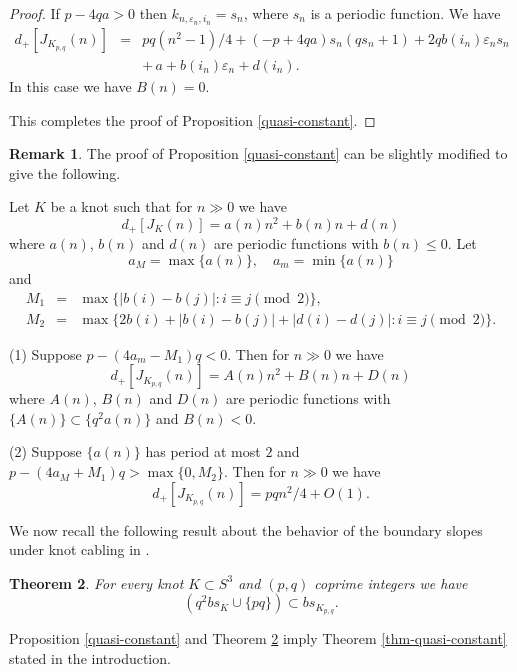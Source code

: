 \documentclass[11pt]{amsart}
\numberwithin{equation}{section}
\theoremstyle{plain}
\newtheorem{theorem}{Theorem}[section]
\theoremstyle{definition}
\newtheorem{remark}[theorem]{Remark}
\newcommand{\QQ}{{\mathbb{Q}}}
\newcommand{\K}{{K_{p, q}}}
\newcommand\no[1]{}
\def\ve{\varepsilon}
\begin{document}
\begin{proof}
If $p - 4qa > 0$ then $k_{n,\ve_n,i_n} = s_n$, where $s_n$ is a periodic function. We have
\begin{eqnarray*}
d_+[J_{K_{p,q}}(n)] &=& pq (n^2-1)/4 
+ (-p + 4qa)s_n (q s_n + 1) + 2q b(i_n) \ve_n s_n\\
&& + \,  a + b(i_n) \ve_n + d(i_n).
\end{eqnarray*}
In this case we have $B(n)=0$.

This completes the proof of Proposition \ref{quasi-constant}.
\end{proof}

\begin{remark} The proof of Proposition \ref{quasi-constant} can be slightly modified to give the following.

Let $K$ be a knot such that for $n \gg 0$ we have
$$
d_+[J_K(n)]=a(n)n^2+b(n)n+d(n)
$$
where $a(n)$, $b(n)$ and $d(n)$ are periodic functions with $b(n) \le 0$. Let
$$a_M = \max\{a(n)\}, \quad a_m = \min\{a(n)\} $$
and
\begin{eqnarray*}
M_1 &=&  \max\{|b(i)-b(j)| : i  \equiv j \pmod{2} \},\\
M_2 &=& \max\{2b(i) + |b(i) - b(j)| +|d(i)-d(j)| : i \equiv j \pmod{2}\}.
\end{eqnarray*}

(1) Suppose $p- (4 a_m -M_1)q < 0$. Then for $n \gg 0$ we have
$$d_+[J_{\K}(n)]=A(n)n^2+B(n)n+D(n)$$
where $A(n)$, $B(n)$ and $D(n)$ are periodic functions with $\{A(n)\} \subset \{q^2 a(n)\}$ and $B(n) < 0$.

(2) Suppose $\{a(n)\}$ has period at most $2$ and  $p- (4a_M + M_1)q > \max\{0,M_2\}$. Then for $n \gg 0$ we have
$$d_+[J_{\K}(n)]=pqn^2/4+O(1).$$
\end{remark}

We now recall the following result about the behavior of the boundary slopes under knot cabling in \cite{Effie-Anh-slope}.

\begin{theorem} \cite{Effie-Anh-slope}
\label{bdry slope}
 For every knot $K \subset S^3$ and  $(p, q)$ coprime  integers
we have 
 $$\left( q^2 bs_K \cup \{pq\} \right) \subset bs_{K_{p,q}}.$$
\end{theorem}

\no{
Here we study knots for which $d_+[J_K(n)]$ has a unique  Jones slope. We have provided conditions under which
if a number $a\in \QQ$ is a Jones slope of a mono-sloped knot $K$ then $q^2a$ is a Jones slopes of the cable knot $\K$.}

Proposition \ref{quasi-constant} and Theorem \ref{bdry slope} imply Theorem \ref{thm-quasi-constant} stated in the introduction.
\end{document}

